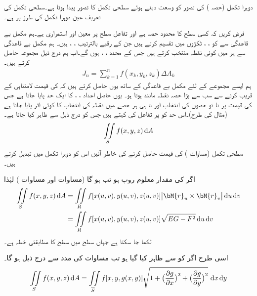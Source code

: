 دوہرا تکمل (حصہ ) کی تصور کو وسعت دیتے ہوئے سطحی تکمل کا تصور پیدا ہوتا ہے۔سطحی تکمل کی تعریف عین دوہرا تکمل کی طرز پر ہے۔

فرض کریں کہ  کسی سطح کا محدود حصہ ہے اور تفاعل  سطح  پر معین اور استمراری ہے۔ہم مکمل بے قاعدگی سے  کو ، ،  ٹکڑوں میں تقسیم کرتے ہیں جن کے  رقبے بالترتیب  ، ،  ہیں۔ ہم مکمل بے قاعدگی سے ہر  میں کوئی نقطہ   منتخب کرتے ہیں جس کے محدد ، ،  ہوں گے۔اب ہم درج ذیل مجموعہ حاصل کرتے ہیں۔
\begin{align}\label{مساوات_خطی_تکمل_سطحی_تکمل_الف}
J_n=\sum_{k=1}^{n}f(x_k,y_k,z_k)\Delta A_k
\end{align}
ہم ایسے مجموعے  کے لئے مکمل بے قاعدگی کے ساتھ یوں حاصل کرتے ہیں کہ  کی قیمت لامتناہی کے قریب کرنے سے سب سے بڑا حصہ  نقطہ مانند ہوتا ہو۔ یوں حاصل اعداد ، ،  کا ایک حد پایا جاتا ہے جس کی قیمت پر نا تو حصوں کی انتخاب اور نا ہی ہر حصے میں نقطہ کی انتخاب کا کوئی اثر پایا جاتا ہے (مثال  کی طرح)۔اس حد کو  پر تفاعل  کی  کہتے ہیں جس کو درج ذیل سے ظاہر کیا جاتا ہے۔
\begin{align}\label{مساوات_خطی_تکمل_سطحی_تکمل_ب}
\iint\limits_S f(x,y,z)\dif A
\end{align}
سطحی تکمل (مساوات ) کی قیمت حاصل کرنے کی خاطر آئیں اس کو دوہرا تکمل میں تبدیل کرتے ہیں۔

اگر  کی مقدار معلوم روپ  ہو تب  ہو گا (مساوات  اور مساوات ) لہٰذا
\begin{gather}
\begin{aligned}
\iint\limits_S f(x,y,z)\dif A&=\iint\limits_R f[x(u,v),y(u,v),z(u,v)] \abs{\bM{r}_u\times \bM{r}_v}\dif u\dif v\\
&=\iint\limits_R f[x(u,v),y(u,v),z(u,v)] \sqrt{EG-F^2}\dif u\dif v 
\end{aligned}
\end{gather}
لکھا جا سکتا ہے جہاں  سطح میں  سطح  کا مطابقتی خطہ ہے۔ 

اسی طرح اگر  کو  سے ظاہر کیا گیا ہو تب مساوات  کی مدد سے درج ذیل ہو گا۔
\begin{align}
\iint\limits_S f(x,y,z)\dif A=\iint\limits_{\overline{S}} f[x,y,g(x,y)]\sqrt{1+\big(\frac{\partial g}{\partial x}\big)^2+\big(\frac{\partial g}{\partial y}\big)^2}\,\dif x\dif y
\end{align}


